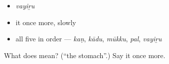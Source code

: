\begin{itemize}
\raggedright
  \item \emph{vayiṟu}
  \item it once more, slowly
  \item all five in order — \emph{kaṇ}, \emph{kādu}, \emph{mūkku}, \emph{pal}, \emph{vayiṟu}
\end{itemize}

\begin{tcolorbox}[breakable,colback=teal!4,colframe=teal!35!black,title={Before you move on}]
What does  mean? (\textquotedblleft{}the stomach\textquotedblright{}.) Say it once more.
\end{tcolorbox}
